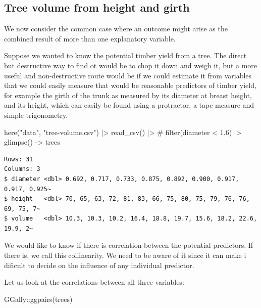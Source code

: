 \documentclass[
  letterpaper,
  DIV=11,
  numbers=noendperiod]{scrreprt}
\newenvironment{Shaded}{\begin{snugshade}}{\end{snugshade}}
\newcommand{\CommentTok}[1]{\textcolor[rgb]{0.37,0.37,0.37}{#1}}
\newcommand{\FunctionTok}[1]{\textcolor[rgb]{0.28,0.35,0.67}{#1}}
\newcommand{\NormalTok}[1]{\textcolor[rgb]{0.00,0.23,0.31}{#1}}
\newcommand{\OtherTok}[1]{\textcolor[rgb]{0.00,0.23,0.31}{#1}}
\newcommand{\SpecialCharTok}[1]{\textcolor[rgb]{0.37,0.37,0.37}{#1}}
\newcommand{\StringTok}[1]{\textcolor[rgb]{0.13,0.47,0.30}{#1}}
\begin{document}
\subsection{Tree volume from height and
girth}\label{tree-volume-from-height-and-girth}

We now consider the common case where an outcome might arise as the
combined result of more than one explanatory variable.

Suppose we wanted to know the potential timber yield from a tree. The
direct but destructive way to find ot would be to chop it down and weigh
it, but a more useful and non-destructive route would be if we could
estimate it from variables that we could easily measure that would be
reasonable predictors of timber yield, for example the girth of the
trunk as measured by its diameter at breast height, and its height,
which can easily be found using a protractor, a tape measure and simple
trigonometry.

\begin{Shaded}
\begin{Highlighting}[]
  \FunctionTok{here}\NormalTok{(}\StringTok{"data"}\NormalTok{, }\StringTok{"tree{-}volume.csv"}\NormalTok{) }\SpecialCharTok{|\textgreater{}}
  \FunctionTok{read\_csv}\NormalTok{() }\SpecialCharTok{|\textgreater{}}
  \CommentTok{\# filter(diameter \textless{} 1.6) |\textgreater{}}
  \FunctionTok{glimpse}\NormalTok{() }\OtherTok{{-}\textgreater{}} 
\NormalTok{  trees}
\end{Highlighting}
\end{Shaded}

\begin{verbatim}
Rows: 31
Columns: 3
$ diameter <dbl> 0.692, 0.717, 0.733, 0.875, 0.892, 0.900, 0.917, 0.917, 0.925~
$ height   <dbl> 70, 65, 63, 72, 81, 83, 66, 75, 80, 75, 79, 76, 76, 69, 75, 7~
$ volume   <dbl> 10.3, 10.3, 10.2, 16.4, 18.8, 19.7, 15.6, 18.2, 22.6, 19.9, 2~
\end{verbatim}

We would like to know if there is correlation between the potential
predictors. If there is, we call this collinearity. We need to be aware
of it since it can make i dificult to decide on the influence of any
individual predictor.

Let us look at the correlations between all three variables:

\begin{Shaded}
\begin{Highlighting}[]
\NormalTok{GGally}\SpecialCharTok{::}\FunctionTok{ggpairs}\NormalTok{(trees)}
\end{Highlighting}
\end{Shaded}
\end{document}
